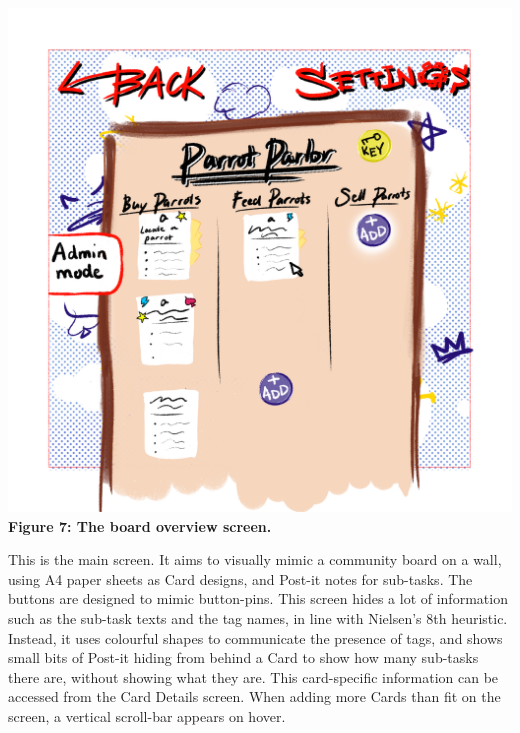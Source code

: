 \includegraphics[scale=0.8]{mocks/hue_mock_board_overview.png}
\textbf{Figure 7: The board overview screen.}
\newline

This is the main screen. It aims to visually mimic a community board on a wall, using A4 paper sheets as Card designs, and Post-it notes for sub-tasks. The buttons are designed to mimic button-pins. This screen hides a lot of information such as the sub-task texts and the tag names, in line with Nielsen's 8th heuristic. Instead, it uses colourful shapes to communicate the presence of tags, and shows small bits of Post-it hiding from behind a Card to show how many sub-tasks there are, without showing what they are. This card-specific information can be accessed from the Card Details screen. When adding more Cards than fit on the screen, a vertical scroll-bar appears on hover.

